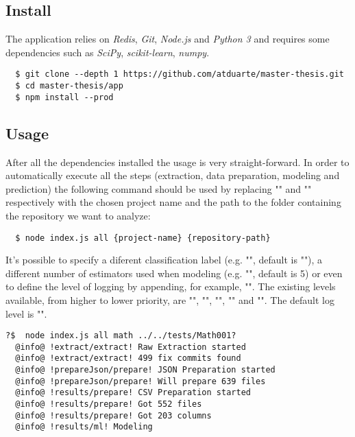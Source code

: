 
\subsection{Install}

The application relies on \emph{Redis}, \emph{Git}, \emph{Node.js} and \emph{Python 3} and requires some dependencies such as \emph{SciPy}, \emph{scikit-learn}, \emph{numpy}.

\begin{lstlisting}
  $ git clone --depth 1 https://github.com/atduarte/master-thesis.git
  $ cd master-thesis/app
  $ npm install --prod
\end{lstlisting}

\subsection{Usage}

After all the dependencies installed the usage is very straight-forward.
In order to automatically execute all the steps (extraction, data preparation, modeling and prediction) the following command should be used
by replacing "" and "" respectively with
the chosen project name and the path to the folder containing the repository we want to analyze:

\begin{lstlisting}
  $ node index.js all {project-name} {repository-path}
\end{lstlisting}

It's possible to specify a diferent classification label (e.g. "", default is ""), 
a different number of estimators used when modeling (e.g. "", default is 5) or even
to define the level of logging by appending, for example, "". The existing levels available, from higher to lower priority, are
"", "", "", "" and "". The default log level is "".

\begin{lstlisting}[style=npmlog]
  ?$  node index.js all math ../../tests/Math001?
  @info@ !extract/extract! Raw Extraction started
  @info@ !extract/extract! 499 fix commits found
  @info@ !prepareJson/prepare! JSON Preparation started
  @info@ !prepareJson/prepare! Will prepare 639 files
  @info@ !results/prepare! CSV Preparation started
  @info@ !results/prepare! Got 552 files
  @info@ !results/prepare! Got 203 columns
  @info@ !results/ml! Modeling
\end{lstlisting}

